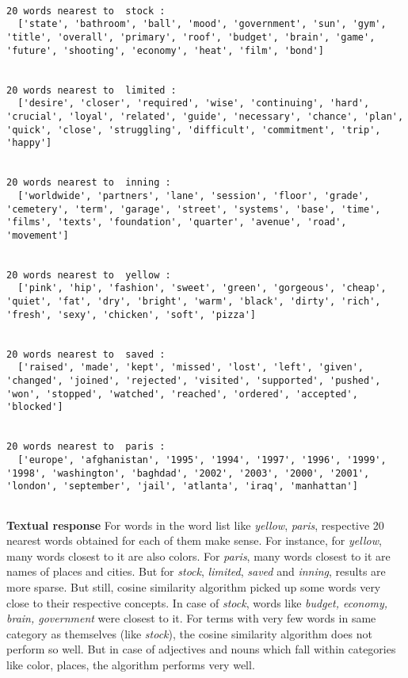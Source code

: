 \documentclass[11pt]{article}
\begin{document}
    \begin{Verbatim}[commandchars=\\\{\}]

20 words nearest to  stock :
  ['state', 'bathroom', 'ball', 'mood', 'government', 'sun', 'gym', 'title', 'overall', 'primary', 'roof', 'budget', 'brain', 'game', 'future', 'shooting', 'economy', 'heat', 'film', 'bond'] 


20 words nearest to  limited :
  ['desire', 'closer', 'required', 'wise', 'continuing', 'hard', 'crucial', 'loyal', 'related', 'guide', 'necessary', 'chance', 'plan', 'quick', 'close', 'struggling', 'difficult', 'commitment', 'trip', 'happy'] 


20 words nearest to  inning :
  ['worldwide', 'partners', 'lane', 'session', 'floor', 'grade', 'cemetery', 'term', 'garage', 'street', 'systems', 'base', 'time', 'films', 'texts', 'foundation', 'quarter', 'avenue', 'road', 'movement'] 


20 words nearest to  yellow :
  ['pink', 'hip', 'fashion', 'sweet', 'green', 'gorgeous', 'cheap', 'quiet', 'fat', 'dry', 'bright', 'warm', 'black', 'dirty', 'rich', 'fresh', 'sexy', 'chicken', 'soft', 'pizza'] 


20 words nearest to  saved :
  ['raised', 'made', 'kept', 'missed', 'lost', 'left', 'given', 'changed', 'joined', 'rejected', 'visited', 'supported', 'pushed', 'won', 'stopped', 'watched', 'reached', 'ordered', 'accepted', 'blocked'] 


20 words nearest to  paris :
  ['europe', 'afghanistan', '1995', '1994', '1997', '1996', '1999', '1998', 'washington', 'baghdad', '2002', '2003', '2000', '2001', 'london', 'september', 'jail', 'atlanta', 'iraq', 'manhattan'] 


    \end{Verbatim}

    \textbf{Textual response} For words in the word list like \emph{yellow},
\emph{paris}, respective 20 nearest words obtained for each of them make
sense. For instance, for \emph{yellow}, many words closest to it are
also colors. For \emph{paris}, many words closest to it are names of
places and cities. But for \emph{stock}, \emph{limited}, \emph{saved}
and \emph{inning}, results are more sparse. But still, cosine similarity
algorithm picked up some words very close to their respective concepts.
In case of \emph{stock}, words like \emph{budget, economy, brain,
government} were closest to it. For terms with very few words in same
category as themselves (like \emph{stock}), the cosine similarity
algorithm does not perform so well. But in case of adjectives and nouns
which fall within categories like color, places, the algorithm performs
very well.
\end{document}
